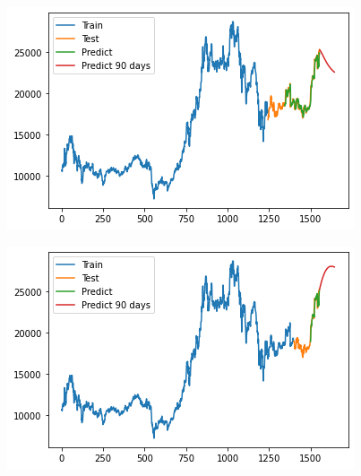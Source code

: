 \documentclass[conference]{IEEEtran}
\begin{document}
\begin{minipage}{0.23\textwidth}
    \centering
    \includegraphics[width=\linewidth]{images/GRU/GRU_MBB_90days_82.png}
    \label{fig:image1}
\end{minipage}
\hfill
\begin{minipage}{0.23\textwidth}
    \centering
    \includegraphics[width=\linewidth]{images/GRU/GRU_MBB_90days_91.png}
    \label{fig:image2}
\end{minipage}
\end{document}
